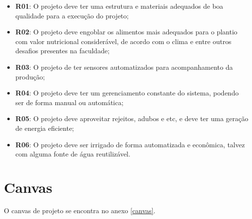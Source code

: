   \begin{itemize}
    \item \textbf{R01}: O projeto deve ter uma estrutura e materiais adequados de boa qualidade para a execução do projeto;
    \item \textbf{R02}: O projeto deve engoblar os alimentos mais adequados para o plantio com valor nutricional considerável, de acordo com o clima e entre outros desafios presentes na faculdade;
    \item \textbf{R03}: O projeto de ter sensores automatizados para acompanhamento da produção;
    \item \textbf{R04}: O projeto deve ter um gerenciamento constante do sistema, podendo ser de forma manual ou automática;
    \item \textbf{R05}: O projeto deve aproveitar rejeitos, adubos e etc, e deve ter uma geração de energia eficiente;
    \item \textbf{R06}: O projeto deve ser irrigado de forma automatizada e econ\^{o}mica, talvez com alguma fonte de água reutilizável.
  \end{itemize}

\section{Canvas}

  O canvas de projeto se encontra no anexo \ref{canvas}.

